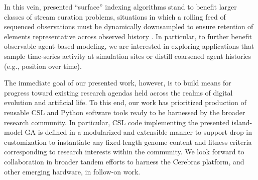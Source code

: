 In this vein, presented ``surface'' indexing algorithms stand to benefit larger classes of stream curation problems, situations in which a rolling feed of sequenced observations must be dynamically downsampled to ensure retention of elements representative across observed history \citep{moreno2024algorithms}.
In particular, to further benefit observable agent-based modeling, we are interested in exploring applications that sample time-series activity at simulation sites or distill coarsened agent histories (e.g., position over time).

The immediate goal of our presented work, however, is to build means for progress toward existing research agendas held across the realms of digital evolution and artificial life.
To this end, our work has prioritized production of reusable CSL and Python software tools ready to be harnessed by the broader research community.
In particular, CSL code implementing the presented island-model GA is defined in a modularized and extensible manner to support drop-in customization to instantiate any fixed-length genome content and fitness criteria corresponding to research interests within the community.
We look forward to collaboration in broader tandem efforts to harness the Cerebras platform, and other emerging hardware, in follow-on work.
